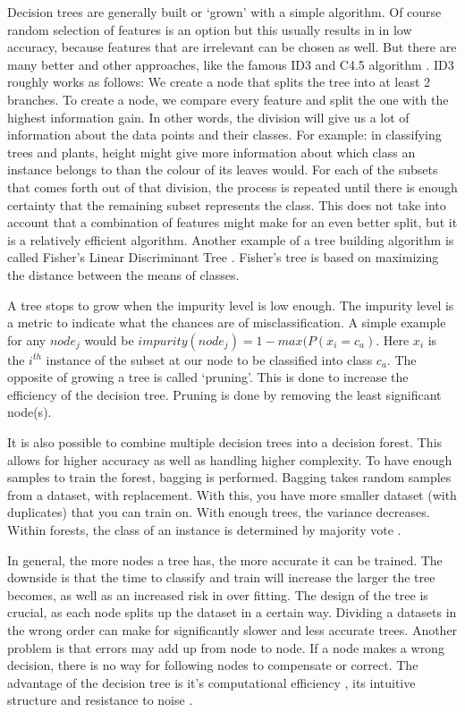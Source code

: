 Decision trees are generally built or `grown' with a simple algorithm. Of course random selection of features is an option but this usually results in in low accuracy, because features that are irrelevant can be chosen as well. But there are many better and other approaches, like the famous ID3 and C4.5 algorithm \cite{niuniu2010review}. ID3 roughly works as follows: We create a node that splits the tree into at least 2 branches. To create a node, we compare every feature and split the one with the highest information gain. In other words, the division will give us a lot of information about the data points and their classes. For example: in classifying trees and plants, height might give more information about which class an instance belongs to than the colour of its leaves would. For each of the subsets that comes forth out of that division, the process is repeated until there is enough certainty that the remaining subset represents the class. This does not take into account that a combination of features might make for an even better split, but it is a relatively efficient algorithm. Another example of a tree building algorithm is called Fisher's Linear Discriminant Tree \cite{LópezChau20136283}. Fisher's tree is based on maximizing the distance between the means of classes. 

A tree stops to grow when the impurity level is low enough. The impurity level is a metric to indicate what the chances are of misclassification. A simple example for any $node_j$ would be $impurity(node_j) = 1 - max(P(x_i = c_a) $. Here $x_i$ is the $i^{th}$ instance of the subset at our node to be classified into class $c_a$. 
The opposite of growing a tree is called `pruning'. This is done to increase the efficiency of the decision tree. Pruning is done by removing the least significant node(s). 

It is also possible to combine multiple decision trees into a decision forest. This allows for higher accuracy as well as handling higher complexity. To have enough samples to train the forest, bagging is performed. Bagging takes random samples from a dataset, with replacement. With this, you have more smaller dataset (with duplicates) that you can train on. With enough trees, the variance decreases. Within forests, the class of an instance is determined by majority vote \cite{Topouzelis201268}. 

In general, the more nodes a tree has, the more accurate it can be trained. The downside is that the time to classify and train will increase the larger the tree becomes, as well as an increased risk in over fitting. The design of the tree is crucial, as each node splits up the dataset in a certain way. Dividing a datasets in the wrong order can make for significantly slower and less accurate trees. Another problem is that errors may add up from node to node. If a node makes a wrong decision, there is no way for following nodes to compensate or correct. The advantage of the decision tree is it's computational efficiency \cite{safavian1991survey}, its intuitive structure and resistance to noise \cite{LópezChau20136283}.